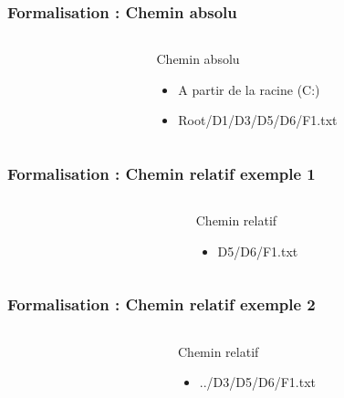 \documentclass{beamer}
\begin{document}
	\begin{frame}
		\frametitle{Formalisation : Chemin absolu}
		\begin{columns}
			\begin{column}[l]{5cm}
				
			\end{column}
			\begin{column}[r]{5cm}
				\begin{block}{Chemin absolu}
					\begin{itemize}
						\item A partir de la racine (C:)
						\item Root/D1/D3/D5/D6/F1.txt
					\end{itemize}
				\end{block}
			\end{column}
		\end{columns}
	\end{frame}
	\begin{frame}
		\frametitle{Formalisation : Chemin relatif exemple 1}
		\begin{columns}
			\begin{column}[l]{5cm}
				
			\end{column}
			\begin{column}[r]{5cm}
				\begin{block}{Chemin relatif}
					\begin{itemize}
						\item D5/D6/F1.txt
					\end{itemize}
				\end{block}
			\end{column}
		\end{columns}
	\end{frame}
	\begin{frame}
		\frametitle{Formalisation : Chemin relatif exemple 2}
		\begin{columns}
			\begin{column}[l]{5cm}
				
			\end{column}
			\begin{column}[r]{5cm}
				\begin{block}{Chemin relatif}
					\begin{itemize}
						\item ../D3/D5/D6/F1.txt
					\end{itemize}
				\end{block}
			\end{column}
		\end{columns}
	\end{frame}
\end{document}
